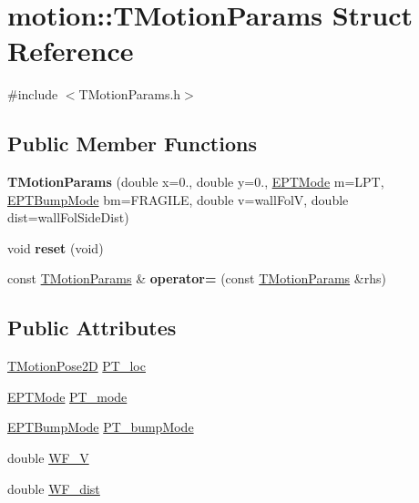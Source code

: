 \hypertarget{structmotion_1_1TMotionParams}{}\section{motion\+:\+:T\+Motion\+Params Struct Reference}
\label{structmotion_1_1TMotionParams}


{\ttfamily \#include $<$T\+Motion\+Params.\+h$>$}

\subsection*{Public Member Functions}
\begin{DoxyCompactItemize}
\item 
\mbox{\label{structmotion_1_1TMotionParams_a0161219617053bae842f1ce93b555c12}} 
{\bfseries T\+Motion\+Params} (double x=0., double y=0., \mbox{\hyperlink{motionEnums_8h_a183cd5b7c370a05cb3b44fb54e0fee66}{E\+P\+T\+Mode}} m=L\+PT, \mbox{\hyperlink{motionEnums_8h_a203932f574f7edf20737611293eecaa3}{E\+P\+T\+Bump\+Mode}} bm=F\+R\+A\+G\+I\+LE, double v=wall\+FolV, double dist=wall\+Fol\+Side\+Dist)
\item 
\mbox{\label{structmotion_1_1TMotionParams_a9a8b167a486d5850503e1c850311dac4}} 
void {\bfseries reset} (void)
\item 
\mbox{\label{structmotion_1_1TMotionParams_a20e1399cfa1c1a494018415a912845be}} 
const \mbox{\hyperlink{structmotion_1_1TMotionParams}{T\+Motion\+Params}} \& {\bfseries operator=} (const \mbox{\hyperlink{structmotion_1_1TMotionParams}{T\+Motion\+Params}} \&rhs)
\end{DoxyCompactItemize}
\subsection*{Public Attributes}
\begin{DoxyCompactItemize}
\item 
\mbox{\hyperlink{structmotion_1_1TMotionPose2D}{T\+Motion\+Pose2D}} \mbox{\hyperlink{structmotion_1_1TMotionParams_aa2a166593403a7d673854c2243676e88}{P\+T\+\_\+loc}}
\item 
\mbox{\hyperlink{motionEnums_8h_a183cd5b7c370a05cb3b44fb54e0fee66}{E\+P\+T\+Mode}} \mbox{\hyperlink{structmotion_1_1TMotionParams_a18e01529102e9029f4f5606e0d129847}{P\+T\+\_\+mode}}
\item 
\mbox{\hyperlink{motionEnums_8h_a203932f574f7edf20737611293eecaa3}{E\+P\+T\+Bump\+Mode}} \mbox{\hyperlink{structmotion_1_1TMotionParams_a2bfcdc11525a62ab3b47ced208c5e44e}{P\+T\+\_\+bump\+Mode}}
\item 
double \mbox{\hyperlink{structmotion_1_1TMotionParams_ab9825758467d9ed3b06efeb705ad4572}{W\+F\+\_\+V}}
\item 
double \mbox{\hyperlink{structmotion_1_1TMotionParams_a821918ccf43fc2a6980945a2f9806257}{W\+F\+\_\+dist}}
\end{DoxyCompactItemize}


